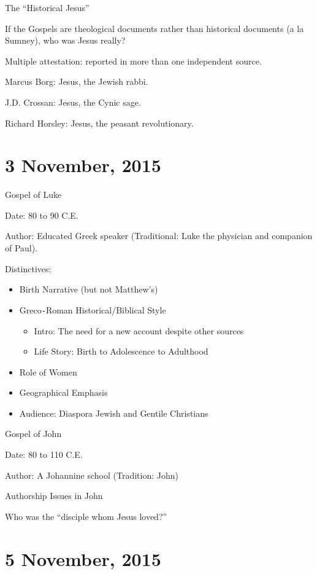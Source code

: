 \documentclass{article}
\begin{document}
    \centerline{The ``Historical Jesus''}

    If the Gospels are theological documents rather than historical documents (a la Sumney), who was Jesus really?

    Multiple attestation: reported in more than one independent source.

    Marcus Borg: Jesus, the Jewish rabbi.

    J.D. Crossan: Jesus, the Cynic sage.

    Richard Horsley: Jesus, the peasant revolutionary.

    \section{3 November, 2015}

    \centerline{Gospel of Luke}

    Date: 80 to 90 C.E.

    Author: Educated Greek speaker (Traditional: Luke the physician and companion of Paul).

    Distinctives:

    \begin{itemize}
        \item Birth Narrative (but not Matthew's)
        \item Greco\texttt{-}Roman Historical/Biblical Style \\
            \begin{itemize}
                    \item Intro: The need for a new account despite other sources
                    \item Life Story: Birth to Adolescence to Adulthood
            \end{itemize}
        \item Role of Women
        \item Geographical Emphasis
        \item Audience: Diaspora Jewish and Gentile Christians
    \end{itemize}

    \centerline{Gospel of John}

    Date: 80 to 110 C.E.

    Author: A Johannine school (Tradition: John)

    Authorship Issues in John

    Who was the ``disciple whom Jesus loved?''

    \section{5 November, 2015}
\end{document}
